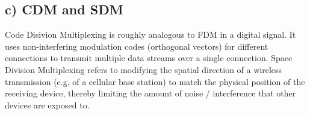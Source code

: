 \documentclass[a4paper, 11 pt, article, accentcolor=tud7b]{tudreport}
\begin{document}
	\subsection*{c) CDM and SDM}
	Code Disivion Multiplexing is roughly analogous to FDM in a digital signal. It uses non-interfering modulation codes (orthogonal vectors) for different connections to transmit multiple data streams over a single connection.
  Space Division Multiplexing refers to modifying the spatial direction of a wireless transmission (e.g. of a cellular base station) to match the physical position of the receiving device, thereby limiting the amount of noise / interference that other devices are exposed to.
\end{document}

